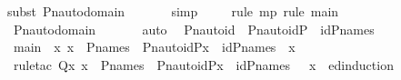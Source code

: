 \begin{isabellebody}
{\isacharparenleft}{\kern0pt}subst\ Pn{\isacharunderscore}{\kern0pt}auto{\isacharunderscore}{\kern0pt}domain{\isacharparenright}{\kern0pt}{\isacharplus}{\kern0pt}\isanewline
\ \ \ \ \ \isamarkupfalse%
\ simp\isanewline
\ \ \ \ \isamarkupfalse%
{\isacharparenleft}{\kern0pt}rule\ mp{\isacharcomma}{\kern0pt}\ rule\ main{\isacharparenright}{\kern0pt}\isanewline
\ \ \ \ \isamarkupfalse%
\ Pn{\isacharunderscore}{\kern0pt}auto{\isacharunderscore}{\kern0pt}domain\ \isanewline
\ \ \ \ \isamarkupfalse%
\ auto\ \isanewline
{}\isamarkupfalse%
%
\endisatagproof
{\isafoldproof}%
%
\isadelimproof
\isanewline
%
\endisadelimproof
\isanewline
{}\isamarkupfalse%
\ Pn{\isacharunderscore}{\kern0pt}auto{\isacharunderscore}{\kern0pt}id\ {\isacharcolon}{\kern0pt}\ {\isachardoublequoteopen}Pn{\isacharunderscore}{\kern0pt}auto{\isacharparenleft}{\kern0pt}id{\isacharparenleft}{\kern0pt}P{\isacharparenright}{\kern0pt}{\isacharparenright}{\kern0pt}\ {\isacharequal}{\kern0pt}\ id{\isacharparenleft}{\kern0pt}P{\isacharunderscore}{\kern0pt}names{\isacharparenright}{\kern0pt}{\isachardoublequoteclose}\ \isanewline
%
\isadelimproof
%
\endisadelimproof
%
\isatagproof
{}\isamarkupfalse%
\ {\isacharminus}{\kern0pt}\isanewline
\ \ \isamarkupfalse%
\ main\ {\isacharcolon}{\kern0pt}\ {\isachardoublequoteopen}{\isasymAnd}x{\isachardot}{\kern0pt}\ x\ {\isasymin}\ P{\isacharunderscore}{\kern0pt}names\ {\isasymlongrightarrow}\ Pn{\isacharunderscore}{\kern0pt}auto{\isacharparenleft}{\kern0pt}id{\isacharparenleft}{\kern0pt}P{\isacharparenright}{\kern0pt}{\isacharparenright}{\kern0pt}{\isacharbackquote}{\kern0pt}x\ {\isacharequal}{\kern0pt}\ id{\isacharparenleft}{\kern0pt}P{\isacharunderscore}{\kern0pt}names{\isacharparenright}{\kern0pt}\ {\isacharbackquote}{\kern0pt}\ x{\isachardoublequoteclose}\ \isanewline
\ \ \ \ \isamarkupfalse%
\ {\isacharparenleft}{\kern0pt}rule{\isacharunderscore}{\kern0pt}tac\ Q{\isacharequal}{\kern0pt}{\isachardoublequoteopen}{\isasymlambda}x{\isachardot}{\kern0pt}\ x\ {\isasymin}\ P{\isacharunderscore}{\kern0pt}names\ {\isasymlongrightarrow}\ Pn{\isacharunderscore}{\kern0pt}auto{\isacharparenleft}{\kern0pt}id{\isacharparenleft}{\kern0pt}P{\isacharparenright}{\kern0pt}{\isacharparenright}{\kern0pt}{\isacharbackquote}{\kern0pt}x\ {\isacharequal}{\kern0pt}\ id{\isacharparenleft}{\kern0pt}P{\isacharunderscore}{\kern0pt}names{\isacharparenright}{\kern0pt}\ {\isacharbackquote}{\kern0pt}\ \ x{\isachardoublequoteclose}\ \ ed{\isacharunderscore}{\kern0pt}induction{\isacharparenright}{\kern0pt}\isanewline

\end{isabellebody}
